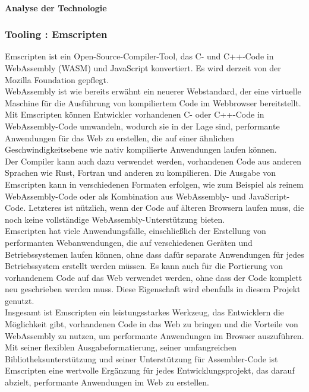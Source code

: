 \paragraph*{Analyse der Technologie}

\subsubsection{Tooling : Emscripten}
Emscripten ist ein Open-Source-Compiler-Tool, das C- und C++-Code in WebAssembly (WASM) und JavaScript konvertiert. Es wird derzeit von der Mozilla Foundation gepflegt. \\
WebAssembly ist wie bereits erwähnt ein neuerer Webstandard, der eine virtuelle Maschine für die Ausführung von kompiliertem Code im Webbrowser bereitstellt. Mit Emscripten können Entwickler vorhandenen C- oder C++-Code in WebAssembly-Code umwandeln, wodurch sie in der Lage sind, performante Anwendungen für das Web zu erstellen, die auf einer ähnlichen Geschwindigkeitsebene wie nativ kompilierte Anwendungen laufen können. \\
Der Compiler kann auch dazu verwendet werden, vorhandenen Code aus anderen Sprachen wie Rust, Fortran und anderen zu kompilieren. Die Ausgabe von Emscripten kann in verschiedenen Formaten erfolgen, wie zum Beispiel als reinem WebAssembly-Code oder als Kombination aus WebAssembly- und JavaScript-Code. Letzteres ist nützlich, wenn der Code auf älteren Browsern laufen muss, die noch keine vollständige WebAssembly-Unterstützung bieten. \\
Emscripten hat viele Anwendungsfälle, einschließlich der Erstellung von performanten Webanwendungen, die auf verschiedenen Geräten und Betriebssystemen laufen können, ohne dass dafür separate Anwendungen für jedes Betriebssystem erstellt werden müssen. Es kann auch für die Portierung von vorhandenem Code auf das Web verwendet werden, ohne dass der Code komplett neu geschrieben werden muss. Diese Eigenschaft wird ebenfalls in diesem Projekt genutzt. \\
Insgesamt ist Emscripten ein leistungsstarkes Werkzeug, das Entwicklern die Möglichkeit gibt, vorhandenen Code in das Web zu bringen und die Vorteile von WebAssembly zu nutzen, um performante Anwendungen im Browser auszuführen. Mit seiner flexiblen Ausgabeformatierung, seiner umfangreichen Bibliotheksunterstützung und seiner Unterstützung für Assembler-Code ist Emscripten eine wertvolle Ergänzung für jedes Entwicklungsprojekt, das darauf abzielt, performante Anwendungen im Web zu erstellen. \\

